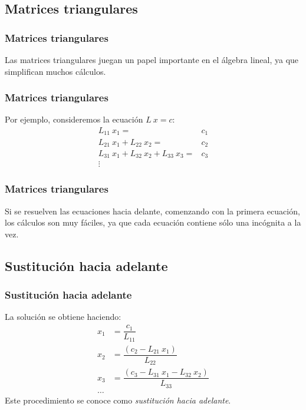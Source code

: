 \subsection*{Matrices triangulares}
\begin{frame}
\frametitle{Matrices triangulares}
Las matrices triangulares juegan un papel importante en el álgebra lineal, ya que simplifican muchos cálculos.
\end{frame}
\begin{frame}
\frametitle{Matrices triangulares}
Por ejemplo, consideremos la ecuación $L \: x = c$:
\begin{align*}
L_{11} \: x_{1} =& c_{1} \\
L_{21} \: x_{1} + L_{22} \: x_{2} =& c_{2} \\
L_{31} \: x_{1} + L_{32} \: x_{2} + L_{33} \: x_{3} =& c_{3} \\
\vdots
\end{align*}
\end{frame}
\begin{frame}
\frametitle{Matrices triangulares}
Si se resuelven las ecuaciones hacia delante, comenzando con la primera ecuación, los cálculos son muy fáciles, ya que cada ecuación contiene sólo una incógnita a la vez.
\end{frame}
\subsection*{Sustitución hacia adelante}
\begin{frame}
\frametitle{Sustitución hacia adelante}
La solución se obtiene haciendo:
\begin{align*}
x_{1} &= \dfrac{c_{1}}{L_{11}} \\
x_{2} &= \dfrac{(c_{2} - L_{21} \: x_{1})}{L_{22}} \\
x_{3} &= \dfrac{(c_{3} - L_{31} \: x_{1} - L_{32} \: x_{2})}{L_{33}} \\
\ldots
\end{align*}
Este procedimiento se conoce como \emph{sustitución hacia adelante}.
\end{frame}
